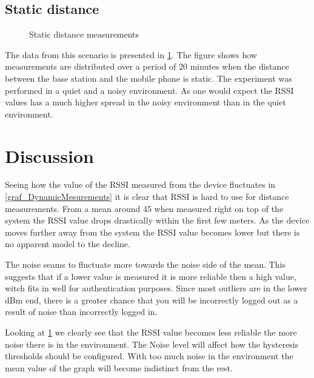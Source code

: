 \subsection{Static distance}
\begin{figure}
	
	
	\caption{Static distance measurements}
	\label{graf_StaticMesurements}
\end{figure}

The data from this scenario is presented in \cref{graf_StaticMesurements}.
The figure shows how measurements are distributed over a period of 20 minutes when the distance between the base station and the mobile phone is static.
The experiment was performed in a quiet and a noisy environment.
As one would expect the RSSI values has a much higher spread in the noisy environment than in the quiet environment. 
 

\section{Discussion}
Seeing how the value of the RSSI measured from the device fluctuates in \cref{graf_DynamicMesurements} it is clear that RSSI is hard to use for distance measurements.
From a mean around 45 when measured right on top of the system the RSSI value drops drastically within the first few meters.
As the device moves further away from the system the RSSI value becomes lower but there is no apparent model to the decline.

The noise seams to fluctuate more towards the noise side of the mean. This suggests that if a lower value is measured it is more reliable then a high value, witch fits in well for authentication purposes.
Since most outliers are in the lower dBm end, there is a greater chance that you will be incorrectly logged out as a result of noise than incorrectly logged in.

Looking at \cref{graf_StaticMesurements} we clearly see that the RSSI value becomes less reliable the more noise there is in the environment.
The Noise level will affect how the hysteresis thresholds should be configured.
With too much noise in the environment the mean value of the graph will become indistinct from the rest.

